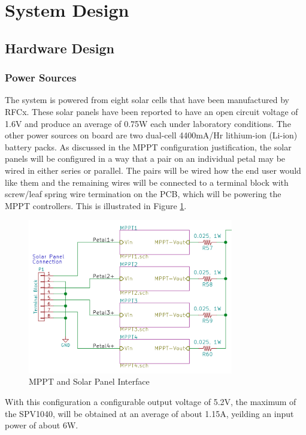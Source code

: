 \documentclass{article}
\numberwithin{figure}{section}
\numberwithin{equation}{section}
\begin{document}
{\section{System Design} \label{sect:sysarch}
\subsection{Hardware Design} \label{sect:hardwaredesign}

\subsubsection{Power Sources}
The system is powered from eight solar cells that have been manufactured by RFCx. These solar panels have been reported to have an open circuit voltage of 1.6V and produce an average of 0.75W each under laboratory conditions. The other power sources on board are two dual-cell 4400mA/Hr lithium-ion (Li-ion) battery packs. As discussed in the MPPT configuration justification, the solar panels will be configured in a way that a pair on an individual petal may be wired in either series or parallel. The pairs will be wired how the end user would like them and the remaining wires will be connected to a terminal block with screw/leaf spring wire termination on the PCB, which will be powering the MPPT controllers. This is illustrated in Figure \ref{fig:mpptsol}.

\begin{figure}[H]
	\centering
	\includegraphics[width=0.8\textwidth]{MPPTblocks}
	\caption{MPPT and Solar Panel Interface}
	\label{fig:mpptsol}
\end{figure}

With this configuration a configurable output voltage of 5.2V, the maximum of the SPV1040, will be obtained at an average of about 1.15A, yeilding an input power of about 6W.

}
\end{document}
